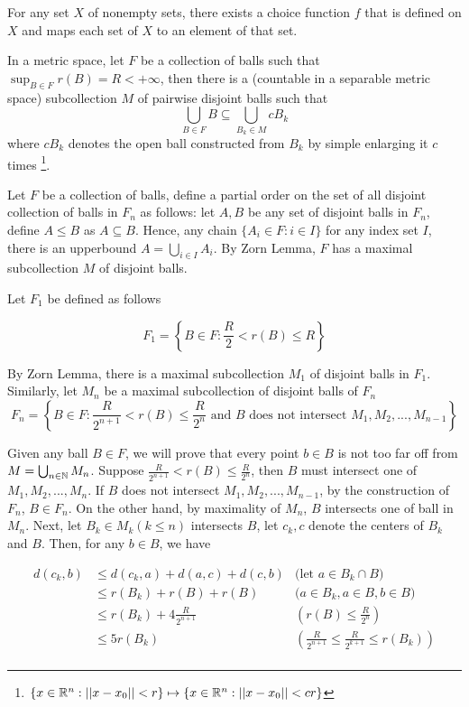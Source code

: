 \documentclass{report}
\begin{document}
\begin{lemma}
    For any set $X$ of nonempty sets, there exists a choice function $f$ that is defined on $X$ and maps each set of $X$ to an element of that set. 
\end{lemma}

\begin{lemma}
    In a metric space, let $F$ be a collection of balls such that $\sup_{B \in F} r(B) = R < +\infty$, then there is a (countable in a separable metric space) subcollection $M$ of pairwise disjoint balls such that
    \[
        \bigcup_{B \in F} B \subseteq \bigcup_{B_k \in M} c B_k
    \]
    where $cB_k$ denotes the open ball constructed from $B_k$ by simple enlarging it $c$ times \footnote{$\{ x \in \mathbb{R}^n: ||x - x_0|| < r \} \mapsto \{ x \in \mathbb{R}^n: ||x - x_0|| < cr \}$ }.
\end{lemma}

Let $F$ be a collection of balls, define a partial order on the set of all disjoint collection of balls in $F_n$ as follows: let $A, B$ be any set of disjoint balls in $F_n$, define $A \leq B$ as $A \subseteq B$. Hence, any chain $\{A_i \in F: i \in I \}$ for any index set $I$, there is an upperbound $A = \bigcup_{i \in I} A_i$. By Zorn Lemma, $F$ has a maximal subcollection $M$ of disjoint balls.

Let $F_1$ be defined as follows

\[
    F_1 = \left\{B \in F: \frac{R}{2} < r(B) \leq R \right\}
\]

By Zorn Lemma, there is a maximal subcollection $M_1$ of disjoint balls in $F_1$. Similarly, let $M_n$ be a maximal subcollection of disjoint balls of $F_n$
\[
    F_n = \left\{B \in F: \frac{R}{2^{n+1}} < r(B) \leq \frac{R}{2^n} \text{ and } B \text{ does not intersect } M_1, M_2, ..., M_{n-1} \right\}
\]

Given any ball $B \in F$, we will prove that every point $b \in B$ is not too far off from $M = \bigcup_{n \in \mathbb{N}} M_n$. Suppose $\frac{R}{2^{n+1}} < r(B) \leq \frac{R}{2^n}$, then $B$ must intersect one of $M_1, M_2, ..., M_n$. If $B$ does not intersect $M_1, M_2, ..., M_{n-1}$, by the construction of $F_n$, $B \in F_n$. On the other hand, by maximality of $M_n$, $B$ intersects one of ball in $M_n$. Next, let $B_k \in M_k (k \leq n)$ intersects $B$, let $c_k, c$ denote the centers of $B_k$ and $B$. Then, for any $b \in B$, we have

\begin{align*}
    d(c_k, b)
    &\leq d(c_k, a) + d(a, c) + d(c, b) &\text{(let $a \in B_k \cap B$)}\\
    &\leq r(B_k) + r(B) + r(B) &\text{($a \in B_k, a \in B, b \in B$)}\\ 
    &\leq r(B_k) + 4 \frac{R}{2^{n+1}} &\text{$\left(r(B) \leq \frac{R}{2^n}\right)$}\\
    &\leq 5 r(B_k) &\text{$\left(\frac{R}{2^{n+1}} \leq \frac{R}{2^{k+1}} \leq r(B_k)\right)$}\\
\end{align*}
\end{document}
